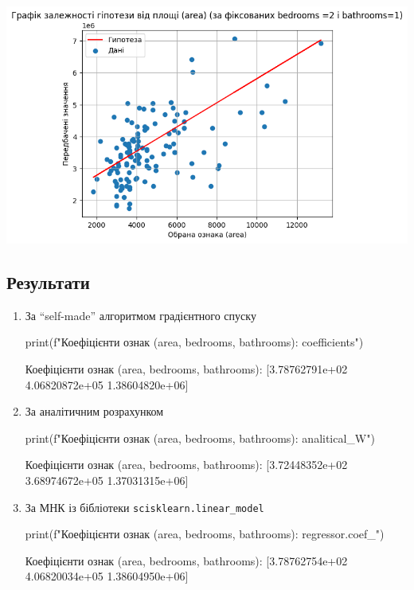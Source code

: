\documentclass[]{article}
\newcounter{pythoncode}
\begin{document}
\begin{center}
	\includegraphics[width=\linewidth]{hw3_files/hw3_28_0.png}
\end{center}



\subsection{Результати}

\begin{enumerate}
	\item За ``self-made'' алгоритмом градієнтного спуску

\begin{pythoncode}
print(f"Коефіцієнти ознак (area, bedrooms, bathrooms): {coefficients}")
\end{pythoncode}

\begin{out}
Коефіцієнти ознак (area, bedrooms, bathrooms): [3.78762791e+02 4.06820872e+05
1.38604820e+06]
\end{out}

\item За аналітичним розрахунком


\begin{pythoncode}
print(f"Коефіцієнти ознак (area, bedrooms, bathrooms): {analitical_W}")
\end{pythoncode}

\begin{out}
	Коефіцієнти ознак (area, bedrooms, bathrooms): [3.72448352e+02 3.68974672e+05
	1.37031315e+06]
\end{out}

\item За МНК із бібліотеки \texttt{scisklearn.linear\_model}

\begin{pythoncode}
print(f"Коефіцієнти ознак (area, bedrooms, bathrooms): {regressor.coef_}")
\end{pythoncode}

\begin{out}
Коефіцієнти ознак (area, bedrooms, bathrooms): [3.78762754e+02 4.06820034e+05
1.38604950e+06]
\end{out}

\end{enumerate}
\end{document}
